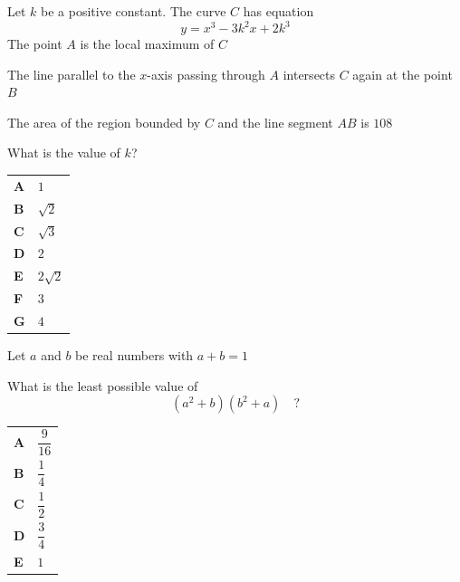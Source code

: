 \documentclass[11pt,a4paper]{article}
\begin{document}
\clearpage
\thispagestyle{djspaper}
\vspace*{8pt}
\begin{enumerate}[label=\textbf{\arabic*.},leftmargin=*,itemsep=0pt,start=17]
\questionitem[Integration]
Let $k$ be a positive constant. The curve $C$ has equation \[y = x^3 - 3k^2 x + 2k^3\]
The point $A$ is the local maximum of $C$

The line parallel to the $x$-axis passing through $A$ intersects $C$ again at the point $B$

The area of the region bounded by $C$ and the line segment $AB$ is $108$

What is the value of $k$?

\par\vspace*{12pt}
\begin{tabularx}{\linewidth}{@{}>{\bfseries}l Y@{}}
A &
$1$
\\[0.8em]
B &
$\sqrt{2}$
\\[0.8em]
C &
$\sqrt{3}$
\\[0.8em]
D &
$2$
\\[0.8em]
E &
$2\sqrt{2}$
\\[0.8em]
F &
$3$
\\[0.8em]
G &
$4$
\\
\end{tabularx}
\end{enumerate}
\clearpage
\thispagestyle{djspaper}
\vspace*{8pt}
\begin{enumerate}[label=\textbf{\arabic*.},leftmargin=*,itemsep=0pt,start=18]
\questionitem[Algebra]
Let $a$ and $b$ be real numbers with $a+b=1$

What is the least possible value of \[(a^2 + b)(b^2 + a)\quad?\]

\par\vspace*{12pt}
\begin{tabularx}{\linewidth}{@{}>{\bfseries}l Y@{}}
A &
$\dfrac{9}{16}$
\\[0.8em]
B &
$\dfrac{1}{4}$
\\[0.8em]
C &
$\dfrac{1}{2}$
\\[0.8em]
D &
$\dfrac{3}{4}$
\\[0.8em]
E &
$1$
\\
\end{tabularx}
\end{enumerate}
\end{document}
